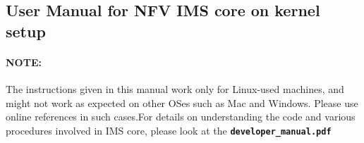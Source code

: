 \documentclass[hidelinks]{report}
\newcommand{\cf}[1] {
	\textbf{\texttt{#1}}
}
\begin{document}

\begin{center}
\section*{User Manual for NFV IMS core on kernel setup}
\end{center}


\paragraph*{NOTE:} The instructions given in this manual work only for Linux-used machines, and might not work as expected
on other OSes such as Mac and Windows. Please use online references in such cases.For details on understanding the code and various procedures involved in IMS core, please look at the \cf{developer\_manual.pdf}
\end{document}
